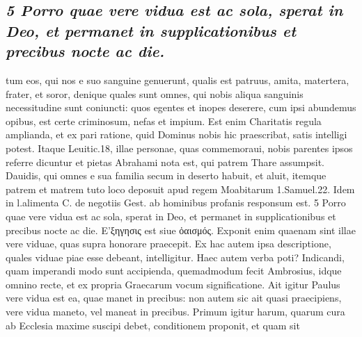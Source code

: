 \documentclass{article}
\begin{document}
\begin{pages}
\subsection*{\textit{5 Porro quae vere vidua est ac sola, sperat in Deo, et permanet in supplicationibus et precibus nocte ac die.}}tum eos, qui nos e suo sanguine genuerunt, qualis est patruus, amita, matertera, frater, et soror, denique quales sunt omnes, qui nobis aliqua sanguinis necessitudine sunt coniuncti: quos egentes et inopes deserere, cum ipsi abundemus opibus, est certe criminosum, nefas et impium. Est enim Charitatis regula amplianda, et ex pari ratione, quid Dominus nobis hic praescribat, satis intelligi potest. Itaque Leuitic.18, illae personae, quas commemoraui, nobis parentes ipsos referre dicuntur et pietas Abrahami nota est, qui patrem Thare assumpsit. Dauidis, qui omnes e sua familia secum in deserto habuit, et aluit, itemque patrem et matrem tuto loco deposuit apud regem Moabitarum 1.Samuel.22. Idem in l.alimenta C. de negotiis Gest. ab hominibus profanis responsum est. 5 Porro quae vere vidua est ac sola, sperat in Deo, et permanet in supplicationibus et precibus nocte ac die. Ε’ξηγησις est siue ὀαισμός. Exponit enim quaenam sint illae vere viduae, quas supra honorare praecepit. Ex hac autem ipsa descriptione, quales viduae piae esse debeant, intelligitur. Haec autem verba poti? Indicandi, quam imperandi modo sunt accipienda, quemadmodum fecit Ambrosius, idque omnino recte, et ex propria Graecarum vocum significatione. Ait igitur Paulus vere vidua est ea, quae manet in precibus: non autem sic ait quasi praecipiens, vere vidua maneto, vel maneat in precibus. Primum igitur harum, quarum cura ab Ecclesia maxime suscipi debet, conditionem proponit, et quam sit  \pend

\end{pages}
\end{document}
